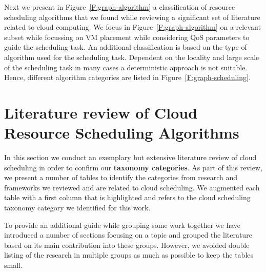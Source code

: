 \documentclass[final,5p,times,twocolumn]{elsarticle}
\begin{document}
Next we present in Figure~\ref{F:graph-algorithm} a classification of
resource scheduling algorithms that we found while reviewing a
significant set of literature related to cloud computing. We focus in
Figure~\ref{F:graph-algorithm} on a relevant subset while focussing on
VM placement while considering QoS parameters to guide the scheduling
task. An additional classification is based on the type of algorithm
used for the scheduling task.  Dependent on the locality and large
scale of the scheduling task in many cases a deterministic approach is
not suitable. Hence, different algorithm categories are listed in
Figure~\ref{F:graph-scheduling}.










\section{Literature review of Cloud Resource Scheduling Algorithms}\label{sec:literature}

In this section we conduct an exemplary but extensive literature
review of cloud scheduling in order to confirm our {\bf taxonomy
  categories}. As part of this review, we present a number of tables
to identify the categories from research and frameworks we reviewed
and are related to cloud scheduling. We augmented each table with a
first column that is highlighted and refers to the cloud scheduling
taxonomy category we identified for this work.

To provide an additional guide while grouping some work together we
have introduced a number of sections focusing on a topic and grouped
the literature based on its main contribution into these
groups. However, we avoided double listing of the research in multiple
groups as much as possible to keep the tables small.
\end{document}

